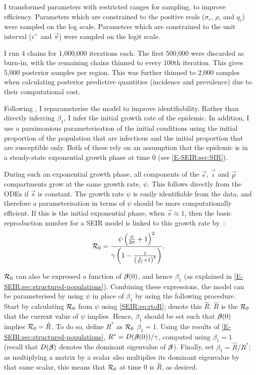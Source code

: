 \documentclass[thesis.tex]{subfiles}
\begin{document}
I transformed parameters with restricted ranges for sampling, to improve efficiency.
Parameters which are constrained to the positive reals ($\sigma_\epsilon$, $\rho$, and $q_c$) were sampled on the log scale.
Parameters which are constrained to the unit interval ($i^+$ and $\vec{\pi}$) were sampled on the logit scale.

I run 4 chains for 1,000,000 iterations each.
The first 500,000 were discarded as burn-in, with the remaining chains thinned to every 100th iteration.
This gives 5,000 posterior samples per region.
This was further thinned to 2,000 samples when calculating posterior predictive quantities (incidence and prevalence) due to their computational cost.

Following \textcite{birrellBayesian}, I reparameterise the model to improve identifiability.
Rather than directly inferring $\beta_1$, I infer the initial growth rate of the epidemic.
In addition, I use a parsimonious parameterisation of the initial conditions using the initial proportion of the population that are infectious and the initial proportion that are susceptible only.
Both of these rely on an assumption that the epidemic is in a steady-state exponential growth phase at time 0 (see \cref{E-SEIR:sec:SIR}).

During such an exponential growth phase, all components of the $\vec{e}$, $\vec{i}$ and $\vec{p}$ compartments grow at the same growth rate, $\psi$.
This follows directly from the ODEs if $\vec{s}$ is constant. 
The growth rate $\psi$ is easily identifiable from the data, and therefore a parameterisation in terms of $\psi$ should be more computationally efficient.
If this is the initial exponential phase, when $\vec{s} \approx 1$, then the basic reproduction number for a SEIR model is linked to this growth rate by~\autocite{birrellBayesian,wearingAppropriate}:
\begin{align}
    \mathcal{R}_{0} = \frac{\psi \left( \frac{\psi}{2\sigma} + 1 \right)^2}{\gamma \left(1 - \frac{1}{\left(\frac{\psi}{2 \gamma} + 1 \right)^2} \right)} \label{SEIR:eq:rtoR}.
\end{align}

$\mathcal{R}_{0}$ can also be expressed a function of $\bm{\beta}(0)$, and hence $\beta_1$ (as explained in \cref{E-SEIR:sec:structured-populations}).
Combining these expressions, the model can be parameterised by using $\psi$ in place of $\beta_1$ by using the following procedure.
Start by calculating $\mathcal{R}_{0}$ from $\psi$ using \cref{SEIR:eq:rtoR}; denote this $\hat{R}$.
$\hat{R}$ is the $\mathcal{R}_{0}$ that the current value of $\psi$ implies.
Hence, $\beta_1$ should be set such that $\bm{\beta}(0)$ implies $\mathcal{R}_{0} = \hat{R}$.
To do so, define $R^*$ as $\mathcal{R}_{0}$ $\beta_1 = 1$.
Using the results of \cref{E-SEIR:sec:structured-populations}, $R^* = D(\bm{\beta}(0)) / \gamma$, computed using $\beta_1=1$ (recall that $D(\bm{\beta})$ denotes the dominant eigenvalue of $\bm{\beta}$).
Finally, set $\beta_1 = \hat{R} / R^*$; as multiplying a matrix by a scalar also multiplies its dominant eigenvalue by that same scalar, this means that $\mathcal{R}_{0}$ at time 0 is $\hat{R}$, as desired.
\end{document}

